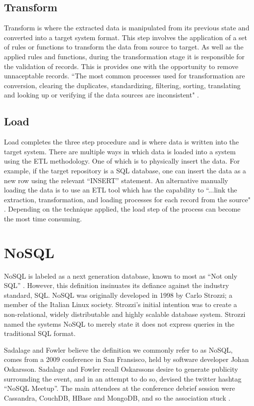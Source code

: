 \subsection{Transform}
Transform is where the extracted data is manipulated from its previous state and converted into a target system format. This step involves the application of a set of rules or functions to transform the data from source to target. As well as the applied rules and functions, during the transformation stage it is responsible for the validation of records. This is provides one with the opportunity to remove unnaceptable records. ``The most common processes used for transformation are conversion, clearing the duplicates, standardizing, filtering, sorting, translating and looking up or verifying if the data sources are inconsistent" \cite{etlref2}.

\subsection{Load}
Load completes the three step procedure and is where data is written into the target system. There are multiple ways in which data is loaded into a system using the ETL methodology. One of which is to physically insert the data. For example, if the target repository is a SQL database, one can insert the data as a new row using the relevant ``INSERT'' statement. An alternative manually loading the data is to use an ETL tool which has the capability to ``...link the extraction, transformation, and loading processes for each record from the source" \cite{etlref2}. Depending on the technique applied, the load step of the process can become the most time consuming.

\section{NoSQL}\label{nosql}
NoSQL is labeled as a next generation database, known to most as ``Not only SQL'' \cite{nosql1}. However, this definition insinuates its defiance against the industry standard, SQL. NoSQL was originally developed in 1998 by Carlo Strozzi; a member of the Italian Linux society. Strozzi's initial intention was to create a non-relational, widely distributable and highly scalable database system. Strozzi named the systems NoSQL to merely state it does not express queries in the traditional SQL format.

Sadalage and Fowler believe the definition we commonly refer to as NoSQL, comes from a 2009 conference in San Fransisco, held by software developer Johan Oskarsson. Sadalage and Fowler recall Oskarssons desire to generate publicity surrounding the event, and in an attempt to do so, devised the twitter hashtag ``NoSQL Meetup''. The main attendees at the conference debrief session were Cassandra, CouchDB, HBase and MongoDB, and so the association stuck \cite{nosql1}.

